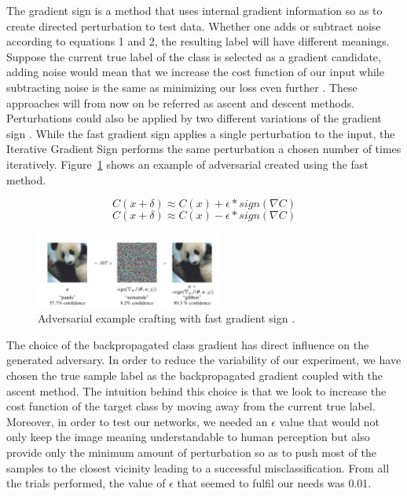 \documentclass[runningheads,a4paper]{llncs}
\begin{document}
The gradient sign is a method that uses internal gradient information so as to create directed perturbation to test data. Whether one adds or subtract noise according to equations 1 and 2, the resulting label will have different meanings. Suppose the current true label of the class is selected as a gradient candidate, adding noise would mean that we increase the cost function of our input while subtracting noise is the same as minimizing our loss even further \cite{goodfellow2016_book}. These approaches will from now on be referred as ascent and descent methods. Perturbations could also be applied by two different variations of the gradient sign \cite{goodfellow2014}. While the fast gradient sign applies a single perturbation to the input, the Iterative Gradient Sign performs the same perturbation a chosen number of times iteratively. Figure~\ref{fig:fgsm_craft} shows an example of adversarial created using the fast method.


\begin{equation}
C(x + \delta)\approx C(x) + \epsilon * sign(\nabla C)
\end{equation}
\begin{equation}
C(x + \delta)\approx C(x) - \epsilon * sign(\nabla C)
\end{equation}
\begin{figure}
	\centering
	\includegraphics[height=2.5cm]{panda.png}
	\caption{Adversarial example crafting with fast gradient sign \cite{goodfellow2014}.}
	\label{fig:fgsm_craft}
\end{figure}

The choice of the backpropagated class gradient has direct influence on the generated adversary. In order to reduce the variability of our experiment, we have chosen the true sample label as the backpropagated gradient coupled with the ascent method. The intuition behind this choice is that we look to increase the cost function of the target class by moving away from the current true label. Moreover, in order to test our networks, we needed an $\epsilon$ value that would not only keep the image meaning understandable to human perception but also provide only the minimum amount of perturbation so as to push most of the samples to the closest vicinity leading to a successful misclassification. From all the trials performed, the value of $\epsilon$ that seemed to fulfil our needs was 0.01. 
\end{document}
